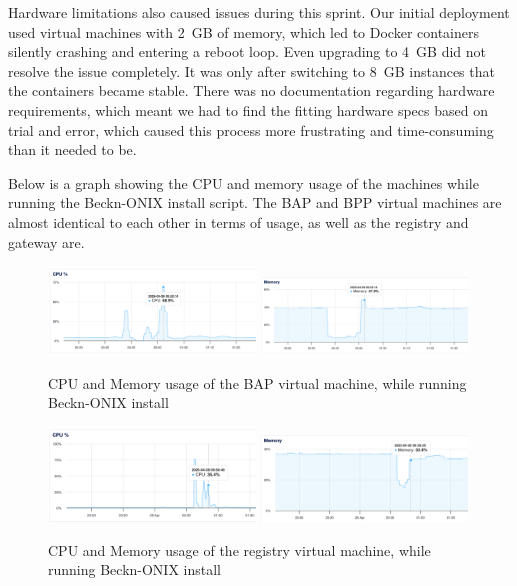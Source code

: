 Hardware limitations also caused issues during this sprint. Our initial deployment used virtual machines with 2~GB of memory, which led to Docker containers silently crashing and entering a reboot loop. Even upgrading to 4~GB did not resolve the issue completely. It was only after switching to 8~GB instances that the containers became stable. There was no documentation regarding hardware requirements, which meant we had to find the fitting hardware specs based on trial and error, which caused this process more frustrating and time-consuming than it needed to be.

Below is a graph showing the CPU and memory usage of the machines while running the Beckn-ONIX install script. The BAP and BPP virtual machines are almost identical to each other in terms of usage, as well as the registry and gateway are. \newpage

\begin{figure}[h!]
    \centering
    \includegraphics[width=0.49\textwidth]{Images/bap_cpu.png}%
    \includegraphics[width=0.49\textwidth]{Images/bap_ram.png}
    \caption{CPU and Memory usage of the BAP virtual machine, while running Beckn-ONIX install}
    \label{fig:bap_usage}
\end{figure}
\begin{figure}[h!]
    \centering
    \includegraphics[width=0.49\textwidth]{Images/registry_cpu.png}%
    \includegraphics[width=0.49\textwidth]{Images/registry_ram.png}
    \caption{CPU and Memory usage of the registry virtual machine, while running Beckn-ONIX install}
    \label{fig:registry_usage}
\end{figure}


